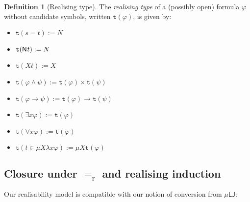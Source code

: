 \documentclass[10pt,a4paper]{amsart}
\theoremstyle{plain}
\theoremstyle{definition}
\newtheorem{definition}[definition]{Definition}
\renewcommand{\phi}{\varphi}
\newcommand{\dfn}{:=}
\theoremstyle{plain}
\theoremstyle{definition} %
\newcommand{\nat}{\mathit{N}}
\newcommand{\N}{\nat} %
\newcommand{\muN}[1]{\mu #1 \subseteq \N}
\newcommand{\LJ}{\mathsf{LJ}}
\newcommand{\muLJ}{\mu\LJ}
\newcommand{\reduction}{\mathrm{r}}
\newcommand{\converts}{=_{\reduction}}
\renewcommand{\land}{\wedge}
\newcommand{\limp}{\to}
\newcommand{\mufo}[3]{\mu #1 \lambda #2 #3}
\newcommand{\type}[1]{\mathtt t (#1)}
\newcommand{\pNat}{\mathsf{N}}
\newcommand{\pnat}[1]{\pNat\hspace{.05em} #1 }
\begin{document}
\begin{definition}
    [Realising type]
    The \emph{realising type} of a (possibly open) formula $\phi$ without candidate symbols, written $\type \phi$, is given by:
\begin{itemize}
    \item $\type{s=t} \dfn \N$
    \item $\type{\pnat t} \dfn \N$
    \item $\type {Xt} \dfn X$
    \item $\type{\phi\land \psi} \dfn \type \phi \times \type \psi$
    \item $\type{\phi \limp \psi} \dfn \type \phi \to \type \psi$
    \item $\type{\exists x \phi}\dfn  \type \phi$
     \item $\type{\forall x \phi} \dfn \type\phi$
    \item $\type {t \in \mufo X x \phi} \dfn \mu X  \type \phi$
\end{itemize}
\end{definition}




\subsection{Closure under $\converts$ and realising induction}
Our realisability model is compatible with our notion of conversion from $\muLJ$:
\end{document}
